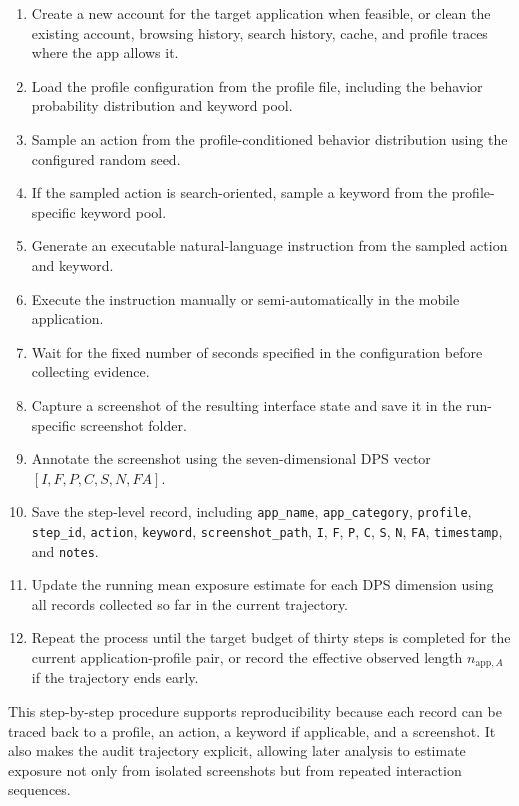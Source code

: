 \begin{enumerate}
    \item Create a new account for the target application when feasible, or clean the existing account, browsing history, search history, cache, and profile traces where the app allows it.
    \item Load the profile configuration from the profile file, including the behavior probability distribution and keyword pool.
    \item Sample an action from the profile-conditioned behavior distribution using the configured random seed.
    \item If the sampled action is search-oriented, sample a keyword from the profile-specific keyword pool.
    \item Generate an executable natural-language instruction from the sampled action and keyword.
    \item Execute the instruction manually or semi-automatically in the mobile application.
    \item Wait for the fixed number of seconds specified in the configuration before collecting evidence.
    \item Capture a screenshot of the resulting interface state and save it in the run-specific screenshot folder.
    \item Annotate the screenshot using the seven-dimensional DPS vector \([I,F,P,C,S,N,FA]\).
    \item Save the step-level record, including \texttt{app\_name}, \texttt{app\_category}, \texttt{profile}, \texttt{step\_id}, \texttt{action}, \texttt{keyword}, \texttt{screenshot\_path}, \texttt{I}, \texttt{F}, \texttt{P}, \texttt{C}, \texttt{S}, \texttt{N}, \texttt{FA}, \texttt{timestamp}, and \texttt{notes}.
    \item Update the running mean exposure estimate for each DPS dimension using all records collected so far in the current trajectory.
    \item Repeat the process until the target budget of thirty steps is completed for the current application-profile pair, or record the effective observed length \(n_{\mathrm{app},A}\) if the trajectory ends early.
\end{enumerate}

This step-by-step procedure supports reproducibility because each record can be traced back to a profile, an action, a keyword if applicable, and a screenshot. It also makes the audit trajectory explicit, allowing later analysis to estimate exposure not only from isolated screenshots but from repeated interaction sequences.

